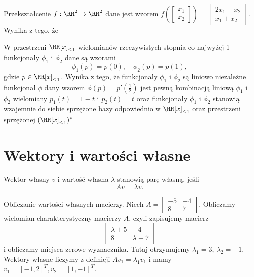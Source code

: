 \begin{problems}
    \prob Przekształcenie $f:\RR^2\rightarrow\RR^2$ dane jest wzorem $f\left(\begin{bmatrix}x_1\\ x_2\end{bmatrix}\right)=\begin{bmatrix}2x_1-x_2\\ x_1+x_2\end{bmatrix}$. Wynika z tego, że

    \prob W przestrzeni $\RR[x]_{\leq 1}$ wielomianów rzeczywistych stopnia co najwyżej 1 funkcjonały $\phi_1$ i $\phi_2$ dane są wzorami 
    $$
    \phi_1(p) = p(0), \quad \phi_2(p) = p(1),
    $$
    gdzie $p \in \RR[x]_{\leq 1}$. Wynika z tego, że
    \answers
    {funkcjonały $\phi_1$ i $\phi_2$ są liniowo niezależne}
    {funkcjonał $\phi$ dany wzorem $\phi(p) = p'(\frac{1}{2})$ jest pewną kombinacją liniową $\phi_1$ i $\phi_2$}
    {wielomiany $p_1(t) = 1-t$ i $p_2(t) = t$ oraz funkcjonały $\phi_1$ i $\phi_2$ stanowią wzajemnie do siebie sprzężone bazy odpowiednio w $\RR[x]_{\leq 1}$ oraz przestrzeni sprzężonej $(\RR[x]_{\leq 1})^*$}
\end{problems}

\section{Wektory i wartości własne}
Wektor własny $v$ i wartość własna $\lambda$ stanowią parę własną, jeśli
$$
Av = \lambda v.
$$
\begin{example}
    Obliczanie wartości własnych macierzy. Niech $A=\begin{bmatrix}
        -5 & -4 \\ 8 & 7
    \end{bmatrix}.$ Obliczamy wielomian charakterystyczny macierzy $A$, czyli zapisujemy macierz $$
    \begin{bmatrix}
        \lambda + 5 & -4 \\
        8 & \lambda - 7
    \end{bmatrix}
    $$ 
    i obliczamy miejsca zerowe wyznacznika. Tutaj otrzymujemy $\lambda_1 = 3, \ \lambda_2=-1$.
    Wektory własne liczymy z definicji $Av_1=\lambda_1 v_1$ i mamy $v_1 = [-1,2]^T, v_2=[1,-1]^T$.
\end{example}

